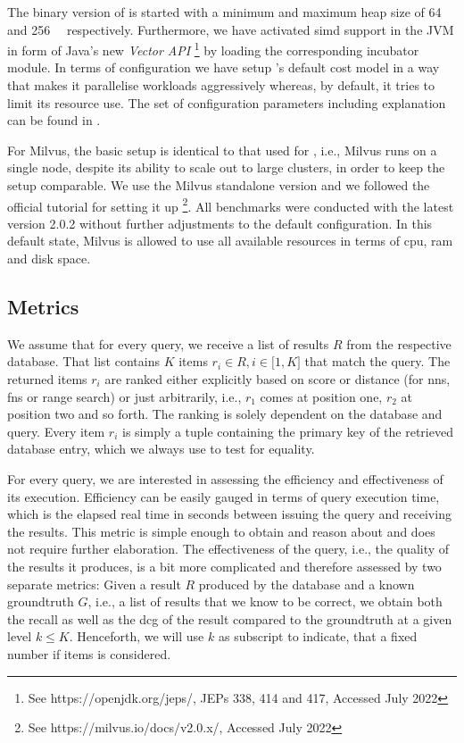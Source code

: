 The binary version of \cottontail{} is started with a minimum and maximum heap size of \SI{64}{\giga\byte} and \SI{256}{\giga\byte} respectively. Furthermore, we have activated \acrshort{simd} support in the JVM in form of Java's new \emph{Vector API} \footnote{See https://openjdk.org/jeps/, JEPs 338, 414 and 417, Accessed July 2022} by loading the corresponding incubator module. In terms of configuration we have setup \cottontail{}'s default cost model in a way that makes it parallelise workloads aggressively whereas, by default, it tries to limit its resource use. The set of configuration parameters including explanation can be found in .

For Milvus, the basic setup is identical to that used for \cottontail{}, i.e., Milvus runs on a single node, despite its ability to scale out to large clusters, in order to keep the setup comparable. We use the Milvus standalone version and we followed the official tutorial for setting it up \footnote{See https://milvus.io/docs/v2.0.x/, Accessed July 2022}. All benchmarks were conducted with the latest version 2.0.2 without further adjustments to the default configuration. In this default state, Milvus is allowed to use all available resources in terms of \acrshort{cpu}, \acrshort{ram} and disk space.

\subsection{Metrics}

We assume that for every query, we receive a list of results $R$ from the respective database. That list contains $K$ items $r_i \in R, i \in \lbrack 1, K  \rbrack $ that match the query. The returned items $r_i$ are ranked either explicitly based on score or distance (for \acrshort{nns}, \acrshort{fns} or range search) or just arbitrarily, i.e., $r_1$ comes at position one, $r_2$ at position two and so forth. The ranking is solely dependent on the database and query. Every item $r_i$ is simply a tuple containing the primary key of the retrieved database entry, which we always use to test for equality.

For every query, we are interested in assessing the efficiency and effectiveness of its execution. Efficiency can be easily gauged in terms of query execution time, which is the elapsed real time in seconds between issuing the query and receiving the results. This metric is simple enough to obtain and reason about and does not require further elaboration. The effectiveness of the query, i.e., the quality of the results it produces, is a bit more complicated and therefore assessed by two separate metrics: Given a result $R$ produced by the database and a known groundtruth $G$, i.e., a list of results that we know to be correct, we obtain both the recall as well as the \acrfull{dcg} \cite{Jarvelin:2002Cumulated} of the result compared to the groundtruth at a given level $k \leq K$. Henceforth, we will use $k$ as subscript to indicate, that a fixed number if items is considered.

